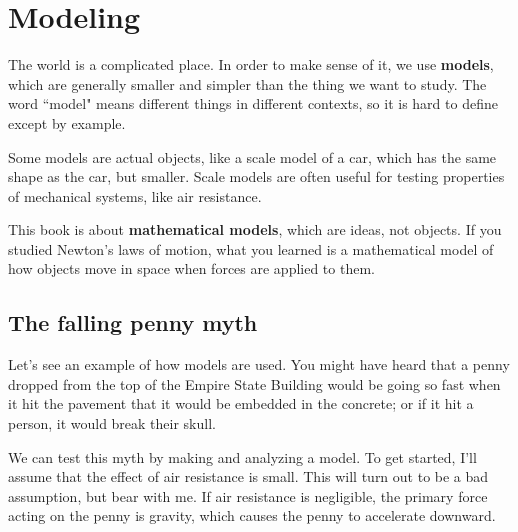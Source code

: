 \documentclass[12pt]{book}
\theoremstyle{exercise}
\begin{document}
\normalsize

\cleardoublepage

\begin{latexonly}


\cleardoublepage

\end{latexonly}

\mainmatter


\chapter{Modeling}
\label{chap01}

The world is a complicated place.  In order to make sense of it, we use {\bf models}, which are generally smaller and simpler than the thing we want to study.  The word ``model" means different things in different contexts, so it is hard to define except by example.

Some models are actual objects, like a scale model of a car, which has the same shape as the car, but smaller.  Scale models are often useful for testing properties of mechanical systems, like air resistance.

This book is about {\bf mathematical models}, which are ideas, not objects.  If you studied Newton's laws of motion, what you learned is a mathematical model of how objects move in space when forces are applied to them.

\section{The falling penny myth}
\label{penny}

Let's see an example of how models are used.  You might have heard that a penny dropped from the top of the Empire State Building would be going so fast when it hit the pavement that it would be embedded in the concrete; or if it hit a person, it would break their skull.

We can test this myth by making and analyzing a model.  To get started, I'll assume that the effect of air resistance is small.  This will turn out to be a bad assumption, but bear with me.  If air resistance is negligible, the primary force acting on the penny is gravity, which causes the penny to accelerate downward.
\end{document}
